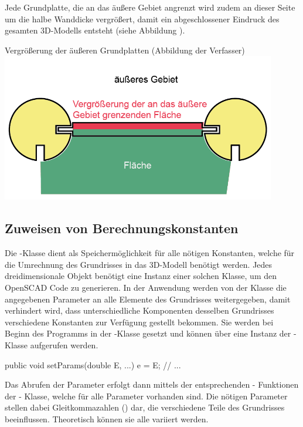 Jede Grundplatte, die an das äußere Gebiet angrenzt wird zudem an dieser Seite um die halbe Wanddicke vergrößert, damit ein abgeschlossener Eindruck des gesamten 3D-Modells entsteht (siehe Abbildung \thebildnrnext).

\begin{Bild}{Vergrößerung der äußeren Grundplatten (Abbildung der Verfasser)}
	\includegraphics[width=120mm]{Bilder/GrundplatteVergroesserung-08}
\end{Bild}

\subsection{Zuweisen von Berechnungskonstanten}
\label{params}
Die -Klasse dient als Speichermöglichkeit für alle nötigen Konstanten, welche für die Umrechnung des Grundrisses in das 3D-Modell benötigt werden.
Jedes dreidimensionale Objekt benötigt eine Instanz einer solchen Klasse, um den OpenSCAD Code zu generieren.
In der Anwendung werden von der Klasse  die angegebenen Parameter an alle Elemente des Grundrisses weitergegeben, damit verhindert wird, dass unterschiedliche Komponenten desselben Grundrisses verschiedene Konstanten zur Verfügung gestellt bekommen.
Sie werden bei Beginn des Programms in der -Klasse gesetzt und können über eine Instanz der -Klasse aufgerufen werden. \\

\begin{code} 
	public void setParams(double E, ...){
		e = E;
		// ...
	}
\end{code}

Das Abrufen der Parameter erfolgt dann mittels der entsprechenden - Funktionen der - Klasse, welche für alle Parameter vorhanden sind. 
Die nötigen Parameter stellen dabei Gleitkommazahlen () dar, die verschiedene Teile des Grundrisses beeinflussen. 
Theoretisch können sie alle variiert werden.


